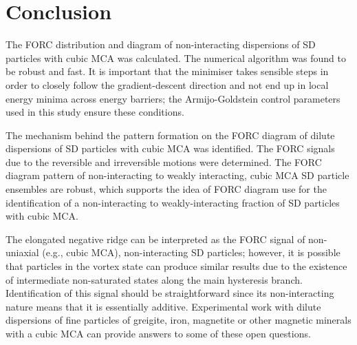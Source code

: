 \section{Conclusion}
The FORC distribution and diagram of non-interacting dispersions of SD particles with cubic MCA was calculated. The numerical algorithm was found to be robust and fast. It is important that the minimiser takes sensible steps in order to closely follow the gradient-descent direction and not end up in local energy minima across energy barriers; the Armijo-Goldstein control parameters used in this study ensure these conditions.\par

The mechanism behind the pattern formation on the FORC diagram of dilute dispersions of SD particles with cubic MCA was identified. The FORC signals due to the reversible and irreversible motions were determined. The FORC diagram pattern of non-interacting to weakly interacting, cubic MCA SD particle ensembles are robust, which supports the idea of FORC diagram use for the identification of a non-interacting to weakly-interacting fraction of SD particles with cubic MCA.\par

The elongated negative ridge can be interpreted as the FORC signal of non-uniaxial (e.g., cubic MCA), non-interacting SD particles; however, it is possible that particles in the vortex state \citep{ValdezGrijalva2017B} can produce similar results due to the existence of intermediate non-saturated states along the main hysteresis branch. Identification of this signal should be straightforward since its non-interacting nature means that it is essentially additive. Experimental work with dilute dispersions of fine particles of greigite, iron, magnetite or other magnetic minerals with a cubic MCA can provide answers to some of these open questions.\par

%
%

